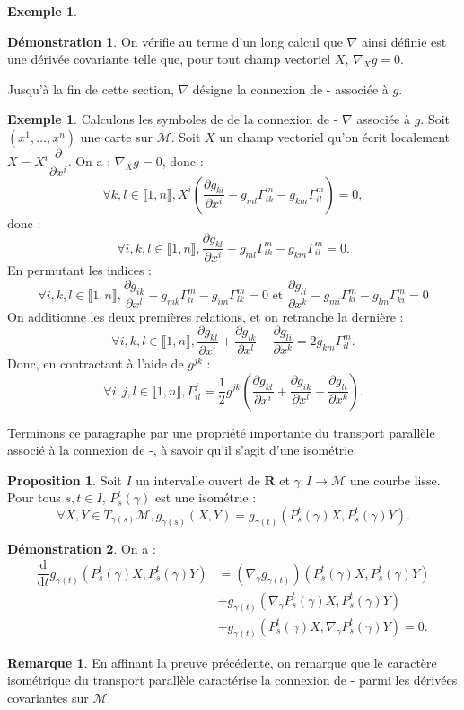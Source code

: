 \documentclass[12pt,a4paper]{article}
\theoremstyle{definition}
\newtheorem{prop}[thm]{Proposition}
\newtheorem{ex}[thm]{Exemple}
\newtheorem{rqe}[thm]{Remarque}
\newtheorem*{dem}{Démonstration}
\begin{document}
\begin{ex}
\begin{dem}
On vérifie au terme d'un long calcul que $\nabla$ ainsi définie est une dérivée covariante telle que, pour tout champ vectoriel $X$, $\nabla_Xg=0$.
\end{dem}
Jusqu'à la fin de cette section, $\nabla$ désigne la connexion de - associée à $g$.
\newpage
\begin{ex}
Calculons les symboles de  de la connexion de - $\nabla$ associée à $g$. Soit $(x^1,\ldots,x^n)$ une carte sur $\mathcal{M}$. Soit $X$ un champ vectoriel qu'on écrit localement $X=X^i\dfrac{\partial}{\partial x^i}$. On a : $\nabla_Xg=0$, donc :
$$
\forall k,l\in\llbracket 1,n\rrbracket, X^i\left(\dfrac{\partial g_{kl}}{\partial x^i}-g_{ml}\Gamma_{ik}^m-g_{km}\Gamma_{il}^m\right)=0,
$$
donc :
$$
\forall i,k,l\in\llbracket 1,n\rrbracket, \dfrac{\partial g_{kl}}{\partial x^i}-g_{ml}\Gamma_{ik}^m-g_{km}\Gamma_{il}^m=0.
$$
En permutant les indices :
$$
\forall i,k,l\in\llbracket 1,n\rrbracket,\dfrac{\partial g_{ik}}{\partial x^l}-g_{mk}\Gamma_{li}^m-g_{im}\Gamma_{lk}^m=0\text{ et }\dfrac{\partial g_{li}}{\partial x^k}-g_{mi}\Gamma^m_{kl}-g_{lm}\Gamma_{ki}^m=0
$$
On additionne les deux premières relations, et on retranche la dernière :
$$
\forall i,k,l\in\llbracket 1,n\rrbracket,\dfrac{\partial g_{kl}}{\partial x^i}+\dfrac{\partial g_{ik}}{\partial x^l}-\dfrac{\partial g_{li}}{\partial x^k}=2 g_{km}\Gamma_{il}^m.
$$
Donc, en contractant à l'aide de $g^{jk}$ :
$$
\forall i,j,l\in\llbracket 1,n\rrbracket, \Gamma_{il}^j=\dfrac{1}{2}g^{jk}\left(\dfrac{\partial g_{kl}}{\partial x^i}+\dfrac{\partial g_{ik}}{\partial x^l}-\dfrac{\partial g_{li}}{\partial x^k}\right).
$$
\end{ex}
Terminons ce paragraphe par une propriété importante du transport parallèle associé à la connexion de -, à savoir qu'il s'agit d'une isométrie.
\begin{prop}
Soit $I$ un intervalle ouvert de $\mathbf{R}$ et $\gamma:I\to\mathcal{M}$ une courbe lisse. Pour tous $s,t\in I$, $P_s^t(\gamma)$ est une isométrie :
$$
\forall X,Y\in T_{\gamma(s)}\mathcal{M}, g_{\gamma(s)}(X,Y)=g_{\gamma(t)}(P_s^t(\gamma)X,P_s^t(\gamma)Y).
$$
\end{prop}
\begin{dem}
On a :
\begin{align*}
\dfrac{\mathrm{d}}{\mathrm{d}t}g_{\gamma(t)}(P_s^t(\gamma)X,P_s^t(\gamma)Y)&=\left(\nabla_{\dot{\gamma}} g_{\gamma(t)}\right)(P_s^t(\gamma)X,P_s^t(\gamma)Y)\\&+g_{\gamma(t)}(\nabla_{\dot{\gamma}}P_s^t(\gamma)X,P_s^t(\gamma)Y)\\&+g_{\gamma(t)}(P_s^t(\gamma)X,\nabla_{\dot{\gamma}}P_s^t(\gamma)Y)=0.
\end{align*}
\end{dem}
\begin{rqe}
En affinant la preuve précédente, on remarque que le caractère isométrique du transport parallèle caractérise la connexion de - parmi les dérivées covariantes sur $\mathcal{M}$.
\end{rqe}
\newpage

\end{ex}
\end{document}
